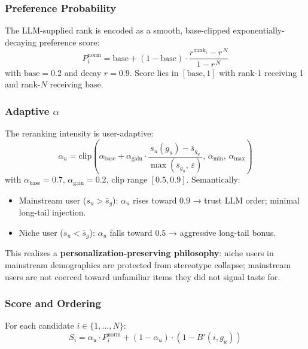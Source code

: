\subsubsection{Preference Probability}

The LLM-supplied rank is encoded as a smooth, base-clipped exponentially-decaying preference score:
\begin{equation}
P_i^{\text{norm}} = \text{base} + (1 - \text{base}) \cdot \frac{r^{\,\text{rank}_i} - r^{\,N}}{1 - r^{\,N}}
\label{eq:p-norm}
\end{equation}
with $\text{base} = 0.2$ and decay $r = 0.9$. Score lies in $[\text{base}, 1]$ with rank-1 receiving 1 and rank-$N$ receiving $\text{base}$.

\subsubsection{Adaptive $\alpha$}

The reranking intensity is user-adaptive:
\begin{equation}
\alpha_u = \mathrm{clip}\!\left(\alpha_{\text{base}} + \alpha_{\text{gain}} \cdot \frac{s_u(g_u) - \bar{s}_{g_u}}{\max(\bar{s}_{g_u},\, \varepsilon)},\, \alpha_{\min},\, \alpha_{\max}\right)
\label{eq:alpha-adaptive}
\end{equation}
with $\alpha_{\text{base}} = 0.7$, $\alpha_{\text{gain}} = 0.2$, clip range $[0.5, 0.9]$. Semantically:
\begin{itemize}
\item Mainstream user ($s_u > \bar{s}_g$): $\alpha_u$ rises toward $0.9$ → trust LLM order; minimal long-tail injection.
\item Niche user ($s_u < \bar{s}_g$): $\alpha_u$ falls toward $0.5$ → aggressive long-tail bonus.
\end{itemize}

This realizes a \textbf{personalization-preserving philosophy}: niche users in mainstream demographics are protected from stereotype collapse; mainstream users are not coerced toward unfamiliar items they did not signal taste for.

\subsubsection{Score and Ordering}

For each candidate $i \in \{1, \dots, N\}$:
\begin{equation}
S_i = \alpha_u \cdot P_i^{\text{norm}} + (1 - \alpha_u) \cdot (1 - B'(i, g_u))
\label{eq:rerank-score}
\end{equation}

